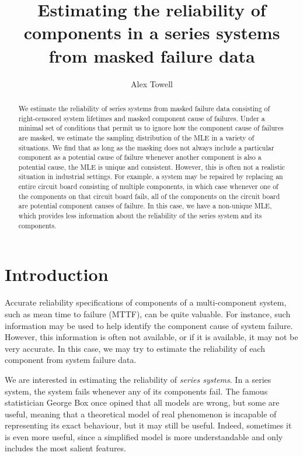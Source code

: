 \documentclass[
]{article}
\title{Estimating the reliability of components in a series systems from
masked failure data}
\author{Alex Towell}
\date{}
\begin{document}
\maketitle
\begin{abstract}
We estimate the reliability of series systems from masked failure data
consisting of right-censored system lifetimes and masked component cause
of failures. Under a minimal set of conditions that permit us to ignore
how the component cause of failures are masked, we estimate the sampling
distribution of the MLE in a variety of situations. We find that as long
as the masking does not always include a particular component as a
potential cause of failure whenever another component is also a
potential cause, the MLE is unique and consistent. However, this is
often not a realistic situation in industrial settings. For example, a
system may be repaired by replacing an entire circuit board consisting
of multiple components, in which case whenever one of the components on
that circuit board fails, all of the components on the circuit board are
potential component causes of failure. In this case, we have a
non-unique MLE, which provides less information about the reliability of
the series system and its components.
\end{abstract}

{
\setcounter{tocdepth}{2}
\tableofcontents
}
\newcommand{\T}{T}
\newtheorem{definition}{Definition}
\newtheorem{theorem}{Theorem}
\newtheorem{corollary}{Corollary}
\newtheorem{condition}{Condition}
\renewcommand{\v}[1]{\boldsymbol{#1}}

\hypertarget{introduction}{%
\section{Introduction}\label{introduction}}

Accurate reliability specifications of components of a multi-component
system, such as mean time to failure (MTTF), can be quite valuable. For
instance, such information may be used to help identify the component
cause of system failure. However, this information is often not
available, or if it is available, it may not be very accurate. In this
case, we may try to estimate the reliability of each component from
system failure data.

We are interested in estimating the reliability of \emph{series
systems}. In a series system, the system fails whenever any of its
components fail. The famous statistician George Box once opined that all
models are wrong, but some are useful, meaning that a theoretical model
of real phenomenon is incapable of representing its exact behaviour, but
it may still be useful. Indeed, sometimes it is even more useful, since
a simplified model is more understandable and only includes the most
salient features.
\end{document}
